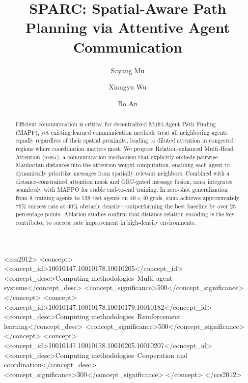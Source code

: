 \documentclass[sigconf]{acmart}
\newcommand{\rmha}{\textsc{rmha}}
\begin{document}
\title{SPARC: Spatial-Aware Path Planning via Attentive Agent
  Communication}

\author{Sayang Mu}

\author{Xiangyu Wu}
\authornotemark[1]

\author{Bo An}

\begin{abstract}
Efficient communication is critical for decentralized
Multi-Agent Path Finding (MAPF), yet existing learned
communication methods treat all neighboring agents equally
regardless of their spatial proximity, leading to diluted
attention in congested regions where coordination matters most.
We propose Relation-enhanced Multi-Head Attention (\rmha), a
communication mechanism that explicitly embeds pairwise Manhattan
distances into the attention weight computation, enabling each
agent to dynamically prioritize messages from spatially relevant
neighbors.
Combined with a distance-constrained attention mask and GRU-gated
message fusion, \rmha{} integrates seamlessly with MAPPO for
stable end-to-end training.
In zero-shot generalization from 8 training agents to 128 test
agents on $40\!\times\!40$ grids, \rmha{} achieves approximately
75\% success rate at 30\% obstacle density---outperforming the
best baseline by over 25 percentage points.
Ablation studies confirm that distance-relation encoding is the
key contributor to success rate improvement in high-density
environments.
\end{abstract}


\begin{CCSXML}
<ccs2012>
   <concept>
       <concept_id>10010147.10010178.10010205</concept_id>
       <concept_desc>Computing methodologies~Multi-agent systems</concept_desc>
       <concept_significance>500</concept_significance>
   </concept>
   <concept>
       <concept_id>10010147.10010178.10010179.10010182</concept_id>
       <concept_desc>Computing methodologies~Reinforcement learning</concept_desc>
       <concept_significance>500</concept_significance>
   </concept>
   <concept>
       <concept_id>10010147.10010178.10010205.10010207</concept_id>
       <concept_desc>Computing methodologies~Cooperation and coordination</concept_desc>
       <concept_significance>300</concept_significance>
   </concept>
</ccs2012>
\end{CCSXML}
\end{document}
